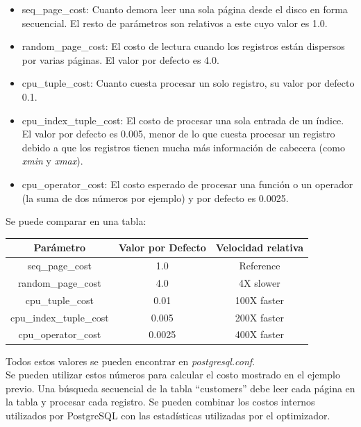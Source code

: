 \begin{itemize}
\item seq\_page\_cost: Cuanto demora leer una sola página desde el disco en forma secuencial. El resto de parámetros son relativos a este cuyo valor es 1.0.
\item random\_page\_cost: El costo de lectura cuando los registros están dispersos por varias páginas. El valor por defecto es 4.0.
\item cpu\_tuple\_cost: Cuanto cuesta procesar un solo registro, su valor por defecto 0.1.
\item cpu\_index\_tuple\_cost: El costo de procesar una sola entrada de un índice. El valor por defecto es 0.005, menor de lo que cuesta procesar un registro debido a que los registros tienen mucha más información de cabecera (como \textit{xmin} y \textit{xmax}).
\item cpu\_operator\_cost: El costo esperado de procesar una función o un operador (la suma de dos números por ejemplo) y por defecto es 0.0025.
\end{itemize}

Se puede comparar en una tabla:\\

\begin{table}[h]
\centering
\begin{tabular}{|c|c|c|} \hline
Parámetro             & Valor por Defecto & Velocidad relativa    \\ \hline
seq\_page\_cost         & 1.0               & Reference \\ \hline
random\_page\_cost      & 4.0               & 4X slower \\ \hline
cpu\_tuple\_cost        & 0.01              & 100X faster\\ \hline     
cpu\_index\_tuple\_cost  & 0.005             & 200X faster \\ \hline
cpu\_operator\_cost     & 0.0025            & 400X faster \\ \hline
\end{tabular}
\end{table}

Todos estos valores se pueden encontrar en \textit{postgresql.conf}.\\

Se pueden utilizar estos números para calcular el costo mostrado en el ejemplo previo. Una búsqueda secuencial de la tabla ``customers'' debe leer cada página en la tabla y procesar cada registro. Se pueden combinar los costos internos utilizados por PostgreSQL con las estadísticas utilizadas por el optimizador.\\

